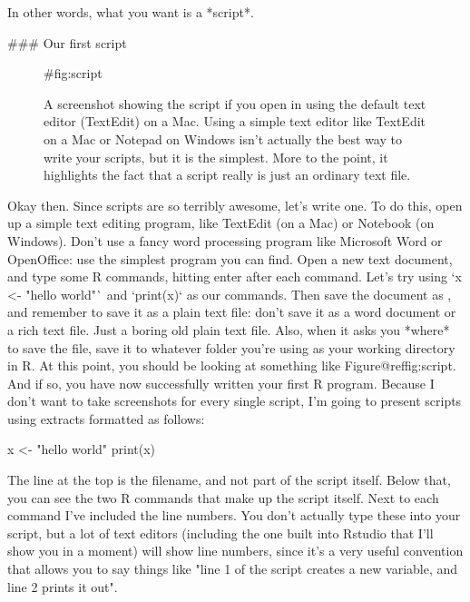 In other words, what you want is a *script*.


### Our first script

\begin{figure}[t]
\begin{center}
\caption{A screenshot showing the  script if you open in using the default text editor (TextEdit) on a Mac. Using a simple text editor like TextEdit on a Mac or Notepad on Windows isn't actually the best way to write your scripts, but it is the simplest. More to the point, it highlights the fact that a script really is just an ordinary text file.}
{#fig:script}
\HR
\end{center}
\end{figure}

Okay then. Since scripts are so terribly awesome, let's write one. To do this, open up a simple text editing program, like TextEdit (on a Mac) or Notebook (on Windows). Don't use a fancy word processing program like Microsoft Word or OpenOffice: use the simplest program you can find. Open a new text document, and type some R commands, hitting enter after each command. Let's try using `x <- "hello world"` and `print(x)` as our commands. Then save the document as , and remember to save it as a plain text file: don't save it as a word document or a rich text file. Just a boring old plain text file. Also, when it asks you *where* to save the file, save it to whatever folder you're using as your working directory in R. At this point, you should be looking at something like Figure@reffig:script. And if so, you have now successfully written your first R program. Because I don't want to take screenshots for every single script, I'm going to present scripts using extracts formatted as follows:

\begin{script}
x <- "hello world"
print(x)
\end{script}
The line at the top is the filename, and not part of the script itself. Below that, you can see the two R commands that make up the script itself. Next to each command I've included the line numbers. You don't actually type these into your script, but a lot of text editors (including the one built into Rstudio that I'll show you in a moment) will show line numbers, since it's a very useful convention that allows you to say things like "line 1 of the script creates a new variable, and line 2 prints it out". 

